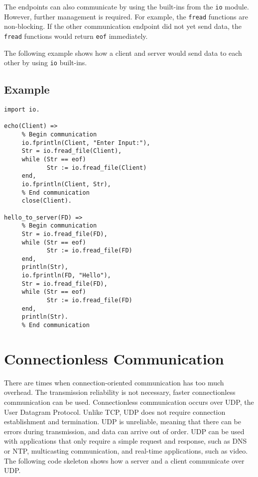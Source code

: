 The endpoints can also communicate by using the built-ins from the \texttt{io} module.  However, further management is required.  For example, the \texttt{fread} functions are non-blocking.  If the other communication endpoint did not yet send data, the \texttt{fread} functions would return \texttt{eof} immediately.

The following example shows how a client and server would send data to each other by using \texttt{io} built-ins.

\subsection*{Example}
\begin{verbatim}
import io.

echo(Client) =>
     % Begin communication
     io.fprintln(Client, "Enter Input:"),
     Str = io.fread_file(Client),
     while (Str == eof)
            Str := io.fread_file(Client)
     end,
     io.fprintln(Client, Str),
     % End communication
     close(Client).

hello_to_server(FD) =>
     % Begin communication
     Str = io.fread_file(FD),
     while (Str == eof)
            Str := io.fread_file(FD)
     end,          
     println(Str),
     io.fprintln(FD, "Hello"),
     Str = io.fread_file(FD),
     while (Str == eof)
            Str := io.fread_file(FD)
     end,          
     println(Str).
     % End communication     
\end{verbatim}

\section{Connectionless Communication}
There are times when connection-oriented communication has too much overhead.  The transmission reliability is not necessary, faster connectionless communication can be used.  Connectionless communication occurs over UDP, the User Datagram Protocol.  Unlike TCP, UDP does not require connection establishment and termination.  UDP is unreliable, meaning that there can be errors during transmission, and data can arrive out of order.  UDP can be used with applications that only require a simple request and response, such as DNS or NTP, multicasting communication, and real-time applications, such as video.  The following code skeleton shows how a server and a client communicate over UDP.

